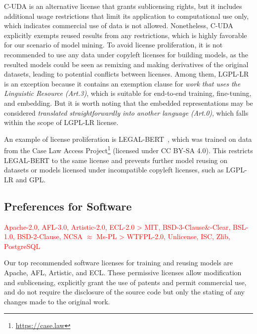 \documentclass[journal]{IEEEtran}
\begin{document}
  C-UDA is an alternative license that grants sublicensing rights, but it includes additional usage restrictions that limit its application to computational use only, which indicates commercial use of data is not allowed.
  Nonetheless, C-UDA explicitly exempts reused results from any restrictions, which is highly favorable for our scenario of model mining.
  To avoid license proliferation, it is not recommended to use any data under copyleft licenses for building models, as the resulted models could be seen as remixing and making derivatives of the original datasets, leading to potential conflicts between licenses.
  Among them, LGPL-LR is an exception because it contains an exemption clause for \textit{work that uses the Linguistic Resource (Art.3)}, which is suitable for end-to-end training, fine-tuning, and embedding. 
  But it is worth noting that the embedded representations may be considered \textit{translated straightforwardly into another language (Art.0)}, which falls within the scope of LGPL-LR license.
  
  An example of license proliferation is LEGAL-BERT~\cite{chalkidis2020legal}, which was trained on data from the Case Law Access Project\footnote{\url{https://case.law}} (licensed under CC BY-SA 4.0). This restricts LEGAL-BERT to the same license and prevents further model reusing on datasets or models licensed under incompatible copyleft licenses, such as LGPL-LR and GPL.

\subsection{Preferences for Software}
\noindent\textcolor{red}{Apache-2.0, AFL-3.0, Artistic-2.0, ECL-2.0 > MIT, BSD-3-Clause\&-Clear, BSL-1.0, BSD-2-Clause, NCSA $\approx$ Ms-PL > WTFPL-2.0, Unlicense, ISC, Zlib, PostgreSQL}
  
  Our top recommended software licenses for training and reusing models are Apache, AFL, Artistic, and ECL.
  These permissive licenses allow modification and sublicensing, explicitly grant the use of patents and permit commercial use, and do not require the disclosure of the source code but only the stating of any changes made to the original work.
\end{document}
